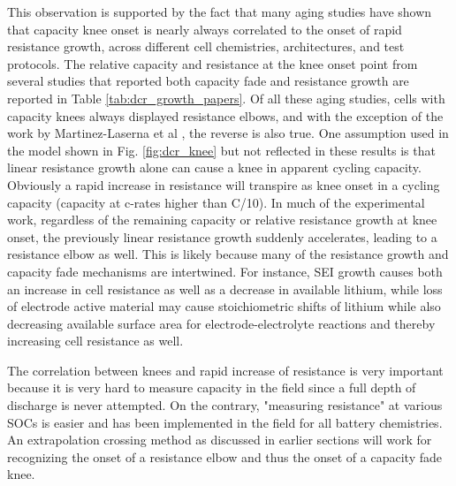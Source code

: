 \documentclass[journal=jpclcd,manuscript=article]{achemso}
\begin{document}
This observation is supported by the fact that many aging studies have shown that capacity knee onset is nearly always correlated to the onset of rapid resistance growth, across different cell chemistries, architectures, and test protocols. The relative capacity and resistance at the knee onset point from several studies that reported both capacity fade and resistance growth are reported in Table \ref{tab:dcr_growth_papers}. Of all these aging studies, cells with capacity knees always displayed resistance elbows, and with the exception of the work by Martinez-Laserna et al \cite{martinez-laserna_technical_2018}, the reverse is also true. One assumption used in the model shown in Fig. \ref{fig:dcr_knee} but not reflected in these results is that linear resistance growth alone can cause a knee in apparent cycling capacity. Obviously a rapid increase in resistance will transpire as knee onset in a cycling capacity (capacity at c-rates higher than C/10). In much of the experimental work, regardless of the remaining capacity or relative resistance growth at knee onset, the previously linear resistance growth suddenly accelerates, leading to a resistance elbow as well. This is likely because many of the resistance growth and capacity fade mechanisms are intertwined. For instance, SEI growth causes both an increase in cell resistance as well as a decrease in available lithium, while loss of electrode active material may cause stoichiometric shifts of lithium while also decreasing available surface area for electrode-electrolyte reactions and thereby increasing cell resistance as well.

The correlation between knees and rapid increase of resistance is very important because it is very hard to measure capacity in the field since a full depth of discharge is never attempted. On the contrary, "measuring resistance" at various SOCs is easier and has been implemented in the field for all battery chemistries. An extrapolation crossing method as discussed in earlier sections will work for recognizing the onset of a resistance elbow and thus the onset of a capacity fade knee. 
\end{document}
